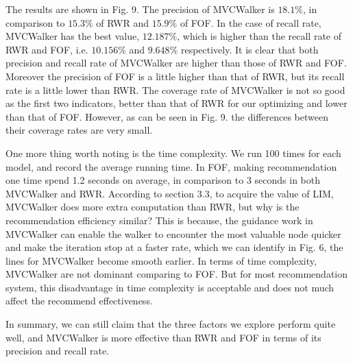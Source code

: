 \documentclass[10pt,journal,compsoc]{IEEEtran}
\begin{document}
The results are shown in Fig. 9. The precision of MVCWalker is $18.1\%$, in comparison to $15.3\%$ of RWR and $15.9\%$ of FOF. In the case of recall rate, MVCWalker has the best value, $12.187\%$, which is higher than the recall rate of RWR and FOF, i.e. $10.156\%$ and $9.648\%$ respectively. It is clear that both precision and recall rate of MVCWalker are higher than those of RWR and FOF. Moreover the precision of FOF is a little higher than that of RWR, but its recall rate is a little lower than RWR. The coverage rate of MVCWalker is not so good as the first two indicators, better than that of RWR for our optimizing and lower than that of FOF. However, as can be seen in Fig. 9. the differences between their coverage rates are very small.

One more thing worth noting is the time complexity. We run 100 times for each model, and record the average running time. In FOF, making recommendation one time spend 1.2 seconds on average, in comparison to 3 seconds in both MVCWalker and RWR. According to section 3.3, to acquire the value of LIM, MVCWalker does more extra computation than RWR, but why is the recommendation efficiency similar? This is because, the guidance work in MVCWalker can enable the walker to encounter the most valuable node quicker and make the iteration stop at a faster rate, which we can identify in Fig. 6, the lines for MVCWalker become smooth earlier. In terms of time complexity, MVCWalker are not dominant comparing to FOF. But for most recommendation system, this disadvantage in time complexity is acceptable and does not much affect the recommend effectiveness.

In summary, we can still claim that the three factors we explore perform quite well, and MVCWalker is more effective than RWR and FOF in terms of its precision and recall rate.

\end{document}
